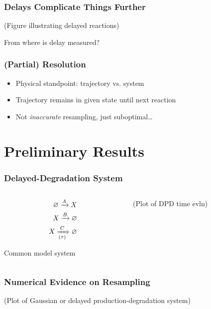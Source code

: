 \documentclass[xcolor={usenames,dvipsnames,svgnames}]{beamer}
\begin{document}
\begin{frame}
    \frametitle{Delays Complicate Things Further}
    (Figure illustrating delayed reactions)

    From where is delay measured?
\end{frame}

\begin{frame}
    \frametitle{(Partial) Resolution}
    \begin{itemize}
        \item Physical standpoint: trajectory vs. system
        \item Trajectory remains in given state until next reaction
        \item Not \emph{inaccurate} resampling, just suboptimal\ldots
    \end{itemize}
\end{frame}


\section{Preliminary Results}

\begin{frame}
    \frametitle{Delayed-Degradation System}
    \begin{columns}[c]
        \begin{column}{0.5\textwidth}
            \begin{align*}
                \varnothing \xrightarrow{A} X \\
                X \xrightarrow{B} \varnothing \\
                X \xRightarrow[(\tau)]{C} \varnothing
            \end{align*}

            Common model system
        \end{column}
        \begin{column}{0.5\textwidth}
            (Plot of DPD time evln)
        \end{column}
    \end{columns}
\end{frame}

\begin{frame}
    \frametitle{Numerical Evidence on Resampling}
    (Plot of Gaussian or delayed production-degradation system)
\end{frame}

\end{document}
